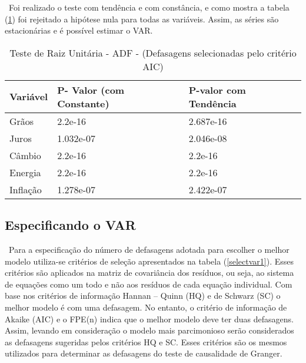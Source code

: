 \documentclass[a4paper,12pt,oneside,titlepage]{article}
\begin{document}
\ Foi realizado o teste com tendência e com constância, e como mostra a tabela (\ref{adf}) foi rejeitado a hipótese nula para todas as variáveis. Assim, as séries são estacionárias e é possível estimar o VAR. 


\begin{table}[H]
	\caption{Teste de Raiz Unitária - ADF - (Defasagens selecionadas pelo critério AIC)}
	\label{adf}
	\begin{center}
		\begin{tabular}{lll}
			\hline
			Variável & P- Valor (com Constante)  & P-valor com Tendência \\ 
			\hline
			Grãos &   2.2e-16  &    2.687e-16   \\ 
			Juros & 1.032e-07   & 2.046e-08    \\ 
			Câmbio & 2.2e-16  & 2.2e-16    \\ 
			Energia & 2.2e-16  &  2.2e-16     \\ 
			Inflação & 1.278e-07   &  2.422e-07    \\ 		
			\hline
		\end{tabular}
	\end{center}
\end{table}   

\subsection{Especificando o VAR}

\ Para a especificação do número de defasagens adotada para escolher o melhor modelo utiliza-se critérios de seleção apresentados na tabela (\ref{selectvar1}). Esses critérios  são aplicados na matriz de covariância dos resíduos,
ou seja, ao sistema de equações como um todo e não aos resíduos de cada equação individual. Com base nos
critérios de informação Hannan – Quinn (HQ) e de Schwarz (SC) o melhor modelo é com uma defasagem. No entanto, o critério de informação de Akaike (AIC) e o FPE(n) indica que o melhor modelo deve ter duas defasagens. Assim, levando em consideração o modelo mais parcimonioso serão considerados as
defasagens sugeridas pelos critérios HQ e SC. Esses critérios são os mesmos utilizados para determinar as defasagens do teste de causalidade de Granger.
\end{document}
